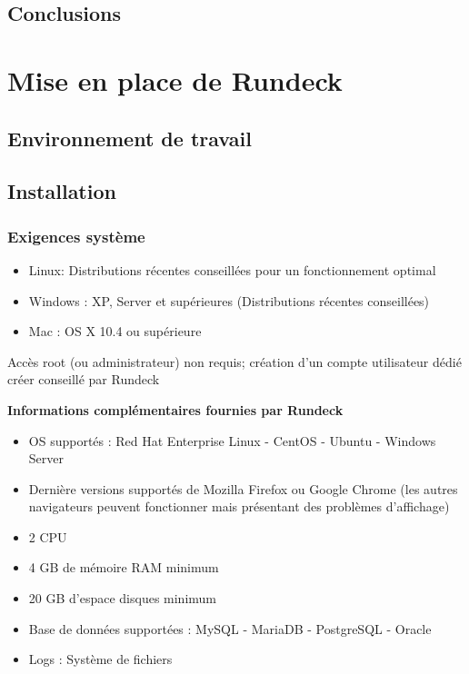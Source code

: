 \documentclass[12pt]{article}
\begin{document}
\subsection{Conclusions}

\section{Mise en place de Rundeck}
\subsection{Environnement de travail}
\subsection{Installation}
\subsubsection{Exigences système}

\begin{itemize}
    \item Linux: Distributions récentes conseillées pour un fonctionnement optimal
    \item Windows : XP, Server et supérieures (Distributions récentes conseillées)
    \item Mac : OS X 10.4 ou supérieure
\end{itemize}

\vspace{0.5cm}

Accès root (ou administrateur) non requis; création d'un compte utilisateur dédié créer conseillé par Rundeck 

\vspace{0.5cm}

\textbf{Informations complémentaires fournies par Rundeck}
\begin{itemize}
    \item OS supportés :  Red Hat Enterprise Linux - CentOS - Ubuntu - Windows Server
    \item Dernière versions supportés de Mozilla Firefox ou Google Chrome (les autres navigateurs peuvent fonctionner mais présentant des problèmes d'affichage)
    \item 2 CPU
    \item 4 GB de mémoire RAM minimum
    \item 20 GB d'espace disques minimum
    \item Base de données supportées : MySQL - MariaDB - PostgreSQL - Oracle
    \item Logs : Système de fichiers
\end{itemize}
\end{document}
